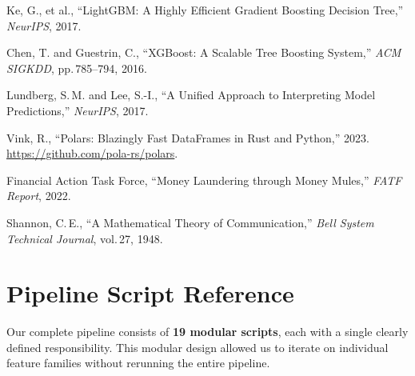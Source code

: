 \documentclass[11pt, a4paper]{article}
\begin{document}
\begin{enumerate}[label={[\arabic*]}, leftmargin=1.5em, itemsep=2pt]
    \item Ke, G., et al., ``LightGBM: A Highly Efficient Gradient Boosting Decision Tree,''
          \textit{NeurIPS}, 2017.
    \item Chen, T. and Guestrin, C., ``XGBoost: A Scalable Tree Boosting System,''
          \textit{ACM SIGKDD}, pp.\,785--794, 2016.
    \item Lundberg, S.\,M. and Lee, S.-I., ``A Unified Approach to Interpreting Model
          Predictions,'' \textit{NeurIPS}, 2017.
    \item Vink, R., ``Polars: Blazingly Fast DataFrames in Rust and Python,'' 2023.
          \url{https://github.com/pola-rs/polars}.
    \item Financial Action Task Force, ``Money Laundering through Money Mules,''
          \textit{FATF Report}, 2022.
    \item Shannon, C.\,E., ``A Mathematical Theory of Communication,''
          \textit{Bell System Technical Journal}, vol.\,27, 1948.
\end{enumerate}


\newpage
\appendix
\section{Pipeline Script Reference}

Our complete pipeline consists of \textbf{19 modular scripts}, each with a single clearly
defined responsibility. This modular design allowed us to iterate on individual feature
families without rerunning the entire pipeline.
\end{document}
